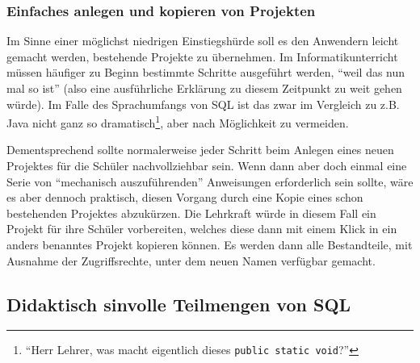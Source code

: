

\subsubsection{Einfaches anlegen und kopieren von Projekten}

Im Sinne einer möglichst niedrigen Einstiegshürde soll es den Anwendern leicht gemacht werden, bestehende Projekte zu übernehmen. Im Informatikunterricht müssen häufiger zu Beginn bestimmte Schritte ausgeführt werden, ``weil das nun mal so ist'' (also eine ausführliche Erklärung zu diesem Zeitpunkt zu weit gehen würde). Im Falle des Sprachumfangs von SQL ist das zwar im Vergleich zu z.B. Java nicht ganz so dramatisch\footnote{``Herr Lehrer, was macht eigentlich dieses \texttt{public static void}?''}, aber nach Möglichkeit zu vermeiden.

Dementsprechend sollte normalerweise jeder Schritt beim Anlegen eines neuen Projektes für die Schüler nachvollziehbar sein. Wenn dann aber doch einmal eine Serie von ``mechanisch auszuführenden'' Anweisungen erforderlich sein sollte, wäre es aber dennoch praktisch, diesen Vorgang durch eine Kopie eines schon bestehenden Projektes abzukürzen. Die Lehrkraft würde in diesem Fall ein Projekt für ihre Schüler vorbereiten, welches diese dann mit einem Klick in ein anders benanntes Projekt kopieren können. Es werden dann alle Bestandteile, mit Ausnahme der Zugriffsrechte, unter dem neuen Namen verfügbar gemacht.

\subsection{Didaktisch sinvolle Teilmengen von SQL}
\label{sec:sql-subset}


